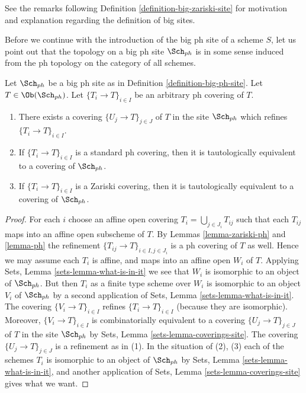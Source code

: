 \noindent
See the remarks following Definition \ref{definition-big-zariski-site}
for motivation and explanation regarding the definition of big sites.

\medskip\noindent
Before we continue with the introduction of the big ph site of
a scheme $S$, let us point out that the topology on a big ph site
$\Sch_{ph}$ is in some sense induced from the ph topology
on the category of all schemes.

\begin{lemma}
\label{lemma-ph-induced}
Let $\Sch_{ph}$ be a big ph site as in
Definition \ref{definition-big-ph-site}.
Let $T \in \Ob(\Sch_{ph})$.
Let $\{T_i \to T\}_{i \in I}$ be an arbitrary ph covering of $T$.
\begin{enumerate}
\item There exists a covering $\{U_j \to T\}_{j \in J}$ of $T$ in the site
$\Sch_{ph}$ which refines $\{T_i \to T\}_{i \in I}$.
\item If $\{T_i \to T\}_{i \in I}$ is a standard ph covering, then
it is tautologically equivalent to a covering of $\Sch_{ph}$.
\item If $\{T_i \to T\}_{i \in I}$ is a Zariski covering, then
it is tautologically equivalent to a covering of $\Sch_{ph}$.
\end{enumerate}
\end{lemma}

\begin{proof}
For each $i$ choose an affine open covering $T_i = \bigcup_{j \in J_i} T_{ij}$
such that each $T_{ij}$ maps into an affine open subscheme of $T$. By
Lemmas \ref{lemma-zariski-ph} and \ref{lemma-ph}
the refinement $\{T_{ij} \to T\}_{i \in I, j \in J_i}$ is a ph covering
of $T$ as well. Hence we may assume each $T_i$ is affine, and maps into
an affine open $W_i$ of $T$. Applying
Sets, Lemma \ref{sets-lemma-what-is-in-it}
we see that $W_i$ is isomorphic to an object of $\Sch_{ph}$.
But then $T_i$ as a finite type scheme over $W_i$
is isomorphic to an object $V_i$ of $\Sch_{ph}$ by a second
application of
Sets, Lemma \ref{sets-lemma-what-is-in-it}.
The covering $\{V_i \to T\}_{i \in I}$ refines $\{T_i \to T\}_{i \in I}$
(because they are isomorphic).
Moreover, $\{V_i \to T\}_{i \in I}$ is combinatorially equivalent to a
covering $\{U_j \to T\}_{j \in J}$ of $T$ in the site
$\Sch_{ph}$ by
Sets, Lemma \ref{sets-lemma-coverings-site}.
The covering $\{U_j \to T\}_{j \in J}$ is a refinement as in (1).
In the situation of (2), (3) each of the
schemes $T_i$ is isomorphic to an object of $\Sch_{ph}$ by
Sets, Lemma \ref{sets-lemma-what-is-in-it},
and another application of
Sets, Lemma \ref{sets-lemma-coverings-site}
gives what we want.
\end{proof}

